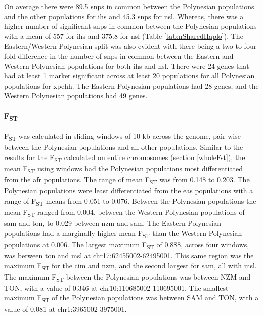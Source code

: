 \documentclass[twoside,openright]{report}
\let\oldparagraph\paragraph
\renewcommand{\paragraph}[1]{\oldparagraph{#1}\mbox{}}
\begin{document}
On average there were 89.5 \glspl{snp} in common between the Polynesian
populations and the other populations for \gls{ihs} and 45.3 \glspl{snp}
for \gls{nsl}. Whereas, there was a higher number of significant
\glspl{snp} in common between the Polynesian populations with a mean of
557 for \gls{ihs} and 375.8 for \gls{nsl} (Table
\ref{tab:nSharedHaplo}). The Eastern/Western Polynesian split was also
evident with there being a two to four-fold difference in the number of
\glspl{snp} in common between the Eastern and Western Polynesian
populations for both \gls{ihs} and \gls{nsl}. There were 24 genes that
had at least 1 marker significant across at least 20 populations for all
Polynesian populations for \gls{xpehh}. The Eastern Polynesian
populations had 28 genes, and the Western Polynesian populations had 49
genes.

\paragraph{\texorpdfstring{F\textsubscript{ST}}{FST}}\label{fst-1}

F\textsubscript{ST} was calculated in sliding windows of 10 kb across
the genome, pair-wise between the Polynesian populations and all other
populations. Similar to the results for the F\textsubscript{ST}
calculated on entire chromosomes (section \ref{wholeFst}), the mean
F\textsubscript{ST} using windows had the Polynesian populations most
differentiated from the \gls{afr} populations. The range of mean
F\textsubscript{ST} was from 0.148 to 0.203. The Polynesian populations
were least differentiated from the \gls{eas} populations with a range of
F\textsubscript{ST} means from 0.051 to 0.076. Between the Polynesian
populations the mean F\textsubscript{ST} ranged from 0.004, between the
Western Polynesian populations of \gls{sam} and \gls{ton}, to 0.029
between \gls{nzm} and \gls{sam}. The Eastern Polynesian populations had
a marginally higher mean F\textsubscript{ST} than the Western Polynesian
populations at 0.006. The largest maximum F\textsubscript{ST} of 0.888,
across four windows, was between \gls{ton} and \gls{msl} at
chr17:62455002-62495001. This same region was the maximum
F\textsubscript{ST} for the \gls{cim} and \gls{nzm}, and the second
largest for \gls{sam}, all with \gls{msl}. The maximum
F\textsubscript{ST} between the Polynesian populations was between NZM
and TON, with a value of 0.346 at chr10:110685002-110695001. The
smallest maximum F\textsubscript{ST} of the Polynesian populations was
between SAM and TON, with a value of 0.081 at chr1:3965002-3975001.
\end{document}
